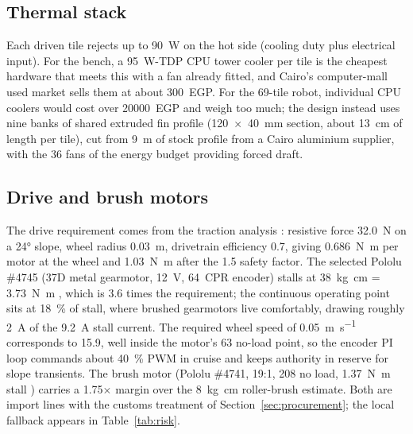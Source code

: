 \documentclass[11pt,a4paper]{article}
\begin{document}
\subsection{Thermal stack}
Each driven tile rejects up to \SI{90}{\watt} on the hot side (cooling duty
plus electrical input). For the bench, a \SI{95}{\watt}-TDP CPU tower
cooler per tile is the cheapest hardware that meets this with a fan
already fitted, and Cairo's computer-mall used market sells them at about
\num{300}~EGP. For the 69-tile robot, individual CPU coolers would cost
over \num{20000}~EGP and weigh too much; the design instead uses nine
banks of shared extruded fin profile (\SI{120x40}{\milli\metre} section,
about \SI{13}{\centi\metre} of length per tile), cut from \SI{9}{\metre}
of stock profile from a Cairo aluminium supplier, with the 36 fans of the
energy budget \cite{nasa_power} providing forced draft.

\subsection{Drive and brush motors}
\label{sec:motors}
The drive requirement comes from the traction analysis
\cite{siegwart2011mobilerobots}: resistive force \SI{32.0}{\newton} on a
\ang{24} slope, wheel radius \SI{0.03}{\metre}, drivetrain efficiency
\num{0.7}, giving \SI{0.686}{\newton\metre} per motor at the wheel and
\SI{1.03}{\newton\metre} after the 1.5 safety factor. The selected Pololu
\#4745 (37D metal gearmotor, \SI{12}{\volt}, 64~CPR encoder) stalls at
\SI{38}{\kilo\gram\centi\metre} = \SI{3.73}{\newton\metre}
\cite{pololu4745}, which is 3.6 times the requirement; the continuous
operating point sits at \SI{18}{\percent} of stall, where brushed
gearmotors live comfortably, drawing roughly \SI{2}{\ampere} of the
\SI{9.2}{\ampere} stall current. The required wheel speed of
\SI{0.05}{\metre\per\second} corresponds to \SI{15.9}{\rpm}, well inside
the motor's \SI{63}{\rpm} no-load point, so the encoder PI loop commands
about \SI{40}{\percent} PWM in cruise and keeps authority in reserve for
slope transients. The brush motor (Pololu \#4741, 19:1, \SI{208}{\rpm}
no load, \SI{1.37}{\newton\metre} stall \cite{pololu4741}) carries a
1.75$\times$ margin over the \SI{8}{\kilo\gram\centi\metre} roller-brush
estimate. Both are import lines with the customs treatment of
Section~\ref{sec:procurement}; the local fallback appears in
Table~\ref{tab:risk}.
\end{document}
